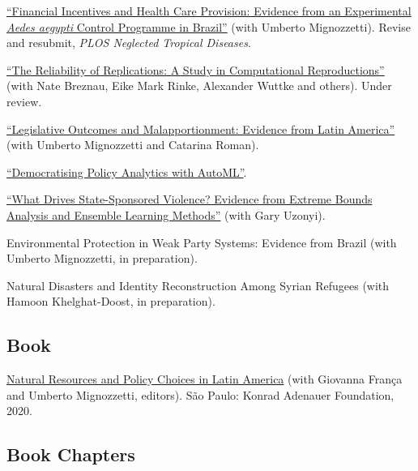 \documentclass[a4paper]{article}
\renewenvironment{itemize}{
	\begin{list}{}{
			\setlength{\leftmargin}{1.5em}
		}
		}{
	\end{list}
}
\begin{document}
\begin{itemize}
\item \href{https://github.com/danilofreire/incentives-healthcare}{``Financial Incentives and Health Care Provision: Evidence from an Experimental \textit{Aedes aegypti} Control Programme in Brazil''} (with Umberto Mignozzetti). Revise and resubmit, \textit{PLOS Neglected Tropical Diseases}.
\item \href{https://osf.io/preprints/socarxiv/j7qta}{``The Reliability of Replications: A Study in Computational
Reproductions''} (with Nate Breznau, Eike Mark Rinke, Alexander Wuttke and others). Under review.
\item \href{https://github.com/danilofreire/danilofreire.github.io/blob/master/malapportionment.pdf}{``Legislative Outcomes and Malapportionment: Evidence from Latin America''} (with Umberto Mignozzetti and Catarina Roman).
\item \href{https://github.com/danilofreire/mercatus-analytics-papers/blob/main/automl-paper/automl.pdf}{``Democratising Policy Analytics with AutoML''}.
\item \href{https://osf.io/pzx3q}{``What Drives State-Sponsored Violence? Evidence from Extreme Bounds Analysis and Ensemble Learning Methods''} (with Gary Uzonyi).
\item Environmental Protection in Weak Party Systems: Evidence from Brazil (with Umberto Mignozzetti, in preparation).
\item Natural Disasters and Identity Reconstruction Among Syrian Refugees (with Hamoon Khelghat-Doost, in preparation).
\end{itemize}

\subsection*{Book}

\begin{itemize}
\item \href{https://github.com/danilofreire/danilofreire.github.io/blob/01dc4c9566bb5ade15b5db950046ed0a386fc5f1/texts/natural_resources_policy_choices_latam.pdf}{Natural Resources and Policy Choices in Latin America} (with Giovanna França and Umberto Mignozzetti, editors). São Paulo: Konrad Adenauer Foundation, 2020.
\end{itemize}

\subsection*{Book Chapters}
\end{document}
